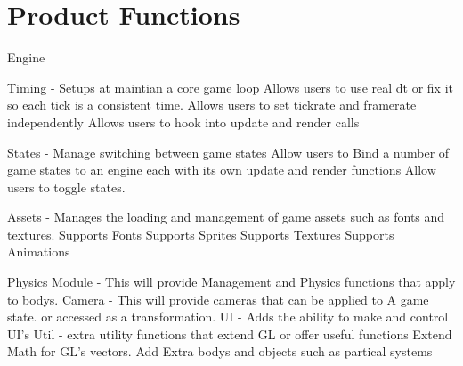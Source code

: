 \documentclass{scrreprt}
\begin{document}

\section{Product Functions}

Engine

	Timing - Setups at maintian a core game loop
		Allows users to use real dt or fix it so each tick is a consistent time.
		Allows users to set tickrate and framerate independently
		Allows users to hook into update and render calls
		
		
	States - Manage switching between game states
		Allow users to Bind a number of game states to an engine each with its own update and render functions
		Allow users to toggle states.
	
	Assets - Manages the loading and management of game assets such as fonts and textures.  
		Supports Fonts
		Supports Sprites
		Supports Textures
		Supports Animations
	
	
Physics Module - This will provide Management and Physics functions that apply to bodys.
Camera - This will provide cameras that can be applied to A game state. or accessed as a transformation.
UI - Adds the ability to make and control UI's 
Util - extra utility functions that extend GL or offer useful functions
	Extend Math for GL's vectors.
	Add Extra bodys and objects such as partical systems

	
\end{document}
